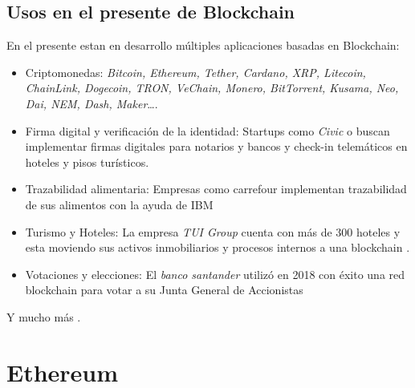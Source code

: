 \subsection{Usos en el presente de Blockchain}
En el presente estan en desarrollo múltiples aplicaciones basadas en Blockchain:

\begin{itemize}
\item Criptomonedas: \emph{Bitcoin, Ethereum, Tether, Cardano, XRP, Litecoin, ChainLink, Dogecoin, TRON, VeChain, Monero, BitTorrent, Kusama, Neo, Dai, NEM, Dash, Maker}\dots \cite{listaCripto}.
\item Firma digital y verificación de la identidad: Startups como \emph{Civic} o \cite{Niuron}\cite{civic, niuron} buscan implementar firmas digitales para notarios y bancos y check-in telemáticos en hoteles y pisos turísticos.
\item Trazabilidad alimentaria: Empresas como carrefour implementan trazabilidad de sus alimentos con la ayuda de IBM \cite{carrefour}
\item Turismo y Hoteles: La empresa \emph{TUI Group} cuenta con más de 300 hoteles y esta moviendo sus activos inmobiliarios y procesos internos a una blockchain \cite{tuig}.
\item Votaciones y elecciones: El \emph{banco santander} utilizó en 2018 con éxito una red blockchain para votar a su Junta General de Accionistas\cite{santanderVotacion}
\end{itemize}

Y mucho más \cite{appCripto}.

\section{Ethereum}

